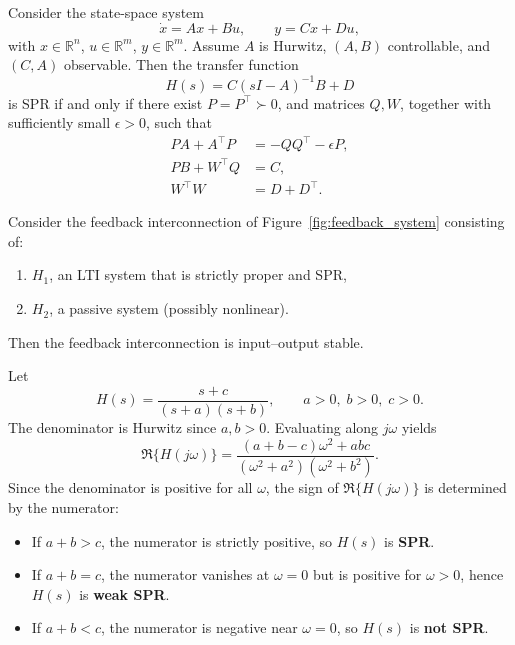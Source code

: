 \begin{corollary}
Consider the state-space system
\begin{equation}
\dot{x} = Ax + Bu, 
\qquad y = Cx + Du,
\end{equation}
with $x \in \mathbb{R}^n$, $u \in \mathbb{R}^m$, $y \in \mathbb{R}^m$.  
Assume $A$ is Hurwitz, $(A,B)$ controllable, and $(C,A)$ observable.  
Then the transfer function 
\begin{equation}
H(s) = C(sI-A)^{-1}B + D
\end{equation}
is SPR if and only if there exist $P = P^\top \succ 0$, and matrices $Q,W$, together 
with sufficiently small $\epsilon > 0$, such that
\begin{align}
PA + A^\top P &= -QQ^\top - \epsilon P, \\
PB + W^\top Q &= C, \\
W^\top W &= D + D^\top.
\end{align}
\end{corollary}

\begin{theorem}
Consider the feedback interconnection of Figure~\ref{fig:feedback_system} consisting of:
\begin{enumerate}
    \item $H_1$, an LTI system that is strictly proper and SPR,
    \item $H_2$, a passive system (possibly nonlinear).
\end{enumerate}
Then the feedback interconnection is input--output stable.
\end{theorem}

\begin{example}
Let
\[
H(s) = \frac{s+c}{(s+a)(s+b)}, 
\qquad a>0,\; b>0,\; c>0.
\]
The denominator is Hurwitz since $a,b>0$.  
Evaluating along $j\omega$ yields
\[
\Re\{H(j\omega)\} 
= \frac{(a+b-c)\omega^2 + abc}{(\omega^2+a^2)(\omega^2+b^2)}.
\]
Since the denominator is positive for all $\omega$, the sign of $\Re\{H(j\omega)\}$ 
is determined by the numerator:
\begin{itemize}
    \item If $a+b > c$, the numerator is strictly positive, so $H(s)$ is \textbf{SPR}.
    \item If $a+b = c$, the numerator vanishes at $\omega=0$ but is positive for $\omega>0$, 
    hence $H(s)$ is \textbf{weak SPR}.
    \item If $a+b < c$, the numerator is negative near $\omega=0$, so $H(s)$ is 
    \textbf{not SPR}.
\end{itemize}
\end{example}


